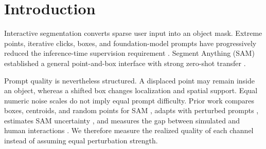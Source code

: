 
\maketitle

\begin{abstract}
Evaluating zero-shot prompted segmentation under uncertain input is difficult because point and box perturbations have no directly comparable scale. We study prompt robustness on all 1,449 PASCAL VOC 2012 validation images, using a disjoint 100-image training subset to calibrate both channels to matched observable quality. Center Color, GrabCut, and superpixel pipelines serve as interpretable CPU baselines alongside SAM ViT-B. Three findings emerge. First, Robust Superpixel improves over Center Color by 0.0640 IoU but remains below GrabCut, showing that its value lies in transparent component analysis rather than state-of-the-art accuracy. Second, SAM's score-based candidate selection provides a modest 0.0193 IoU gain over a single noisy prompt. Third, matched-quality box perturbations become progressively more damaging than point perturbations as prompt quality decreases, while the channels are indistinguishable near quality 0.9. Stratified results further expose systematic failures on thin structures, small targets, and full-image boxes. The study provides a reproducible robustness benchmark, component ablations, and practical guidance for choosing prompt channels and segmentation methods.
\end{abstract}

\section{Introduction}

Interactive segmentation converts sparse user input into an object mask. Extreme points, iterative clicks, boxes, and foundation-model prompts have progressively reduced the inference-time supervision requirement \cite{dextr,ritm,simpleclick,sam}. Segment Anything (SAM) established a general point-and-box interface with strong zero-shot transfer \cite{sam}.

Prompt quality is nevertheless structured. A displaced point may remain inside an object, whereas a shifted box changes localization and spatial support. Equal numeric noise scales do not imply equal prompt difficulty. Prior work compares boxes, centroids, and random points for SAM \cite{gaus}, adapts with perturbed prompts \cite{ppsam}, estimates SAM uncertainty \cite{uncertainsam}, and measures the gap between simulated and human interactions \cite{benenson}. We therefore measure the realized quality of each channel instead of assuming equal perturbation strength.


